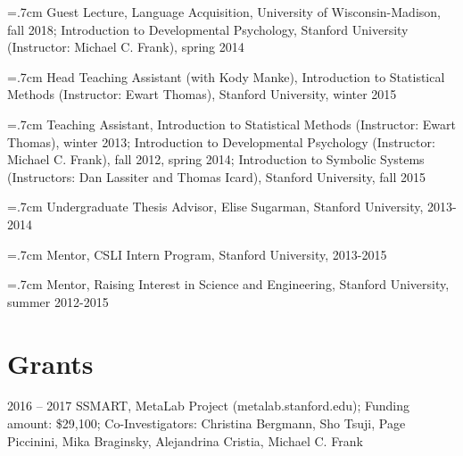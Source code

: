 \documentclass[letterpaper]{article}
\renewenvironment{itemize}{
  \begin{list}{}{
    \setlength{\leftmargin}{1.5em}
  }
}{
  \end{list}
}
\begin{document}
\hangindent=.7cm Guest Lecture, Language Acquisition, University of Wisconsin-Madison, fall 2018; Introduction to Developmental Psychology, Stanford University (Instructor: Michael C. Frank), spring 2014

\hangindent=.7cm Head Teaching Assistant (with Kody Manke), Introduction to Statistical Methods (Instructor: Ewart Thomas), Stanford University, winter 2015

\hangindent=.7cm Teaching Assistant, Introduction to Statistical Methods (Instructor: Ewart Thomas), winter 2013; Introduction to Developmental Psychology (Instructor: Michael C. Frank), fall 2012, spring 2014;  Introduction to Symbolic Systems (Instructors: Dan Lassiter and Thomas Icard),  Stanford University, fall 2015 

\hangindent=.7cm Undergraduate Thesis Advisor,  Elise Sugarman, Stanford University, 2013-2014

\hangindent=.7cm Mentor, CSLI Intern Program, Stanford University, 2013-2015

\hangindent=.7cm Mentor, Raising Interest in Science and Engineering, Stanford University, summer 2012-2015



\section*{Grants}
\begin{itemize}
\item 2016 -- 2017 SSMART, MetaLab Project (metalab.stanford.edu); Funding amount: \$29,100; Co-Investigators: Christina Bergmann, Sho
Tsuji, Page Piccinini, Mika Braginsky, Alejandrina Cristia, Michael C. Frank
\end{itemize}



\bigskip
\end{document}
